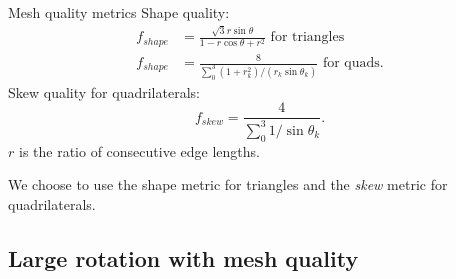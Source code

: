 \documentclass[t,12pt]{beamer}
\begin{document}
\begin{frame}{Mesh quality metrics}
Shape quality:
\begin{align}
f_{shape} &= \frac{\sqrt{3}r\sin\theta}{1-r\cos\theta+r^2} \text{ for triangles} \\
f_{shape} &= \frac{8}{\sum_0^3(1+r_k^2)/(r_k\sin\theta_k)} \text{ for quads.}
\end{align}
Skew quality for quadrilaterals:
\begin{equation}
f_{skew} = \frac{4}{\sum_0^3 1/\sin\theta_k}.
\end{equation}
$r$ is the ratio of consecutive edge lengths.

We choose to use the shape metric for triangles and the \emph{skew} metric for quadrilaterals.
\end{frame}

\subsection{Large rotation with mesh quality}
\end{document}
